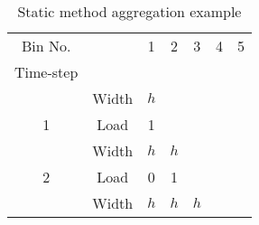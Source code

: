 \documentclass[review,12pt]{elsarticle}
\begin{document}
\begin{table}[htb!]
\centering
\caption{Static method aggregation example}
\label{tab:static example}
\begin{tabular}{|ccccccc|}
\hline
Bin No.                                   &                            & 1                        & 2                                             & 3 & 4                                                                    & 5                                               \\
Time-step                                 &                            &                          &                                               &                                               &                                                                      &                                                 \\ \hline \hline
\multicolumn{1}{|c|}{}                    & \multicolumn{1}{c|}{Width} & \multicolumn{1}{c|}{$h$} & \multicolumn{1}{c|}{\cellcolor[HTML]{9B9B9B}} & \multicolumn{1}{c|}{\cellcolor[HTML]{9B9B9B}} & \multicolumn{1}{c|}{\cellcolor[HTML]{9B9B9B}}                        & \cellcolor[HTML]{9B9B9B}                        \\ \cline{2-7}
\multicolumn{1}{|c|}{\multirow{-2}{*}{1}} & \multicolumn{1}{c|}{Load}  & \multicolumn{1}{c|}{1}   & \multicolumn{1}{c|}{\cellcolor[HTML]{9B9B9B}} & \multicolumn{1}{c|}{\cellcolor[HTML]{9B9B9B}} & \multicolumn{1}{c|}{\cellcolor[HTML]{9B9B9B}}                        & \cellcolor[HTML]{9B9B9B}                        \\ \hline \hline
\multicolumn{1}{|c|}{}                    & \multicolumn{1}{c|}{Width} & \multicolumn{1}{c|}{$h$} & \multicolumn{1}{c|}{$h$}                      & \multicolumn{1}{c|}{\cellcolor[HTML]{9B9B9B}} & \multicolumn{1}{c|}{\cellcolor[HTML]{9B9B9B}}                        & \cellcolor[HTML]{9B9B9B}                        \\ \cline{2-7}
\multicolumn{1}{|c|}{\multirow{-2}{*}{2}} & \multicolumn{1}{c|}{Load}  & \multicolumn{1}{c|}{0}   & \multicolumn{1}{c|}{1}                        & \multicolumn{1}{c|}{\cellcolor[HTML]{9B9B9B}} & \multicolumn{1}{c|}{\cellcolor[HTML]{9B9B9B}}                        & \cellcolor[HTML]{9B9B9B}                        \\ \hline \hline
\multicolumn{1}{|c|}{}                    & \multicolumn{1}{c|}{Width} & \multicolumn{1}{c|}{$h$} & \multicolumn{1}{c|}{$h$}                      & \multicolumn{1}{c|}{$h$}                      & \multicolumn{1}{c|}{\cellcolor[HTML]{9B9B9B}{\color[HTML]{9B9B9B} }} & \cellcolor[HTML]{9B9B9B}{\color[HTML]{9B9B9B} } \\ \cline{2-7}

\end{tabular}
\end{table}
\end{document}
